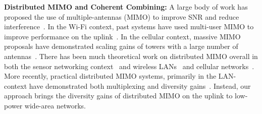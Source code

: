 \noindent \textbf{Distributed MIMO and Coherent Combining: } A large body of work has proposed the use of multiple-antennas (MIMO) to improve SNR and reduce interference~\cite{xie2014scalable, lin2011random, kumar2013bringing}. In the Wi-Fi context, past systems have used multi-user MIMO to improve performance on the uplink~\cite{shen2014rate, tan2009sam, xie2014scalable}. In the cellular context, massive MIMO proposals have demonstrated scaling gains of towers with a large number of antennas~\cite{shepard2012argos, larsson2014massive}. There has been much theoretical work on distributed MIMO overall in both the sensor networking context~\cite{del2007cooperative} and wireless LANs~\cite{dohler2004resource} and cellular networks~\cite{sawahashi2010coordinated}.  More recently, practical distributed MIMO systems, primarily in the LAN-context have demonstrated both multiplexing and diversity gains~\cite{hamed2016real, yenamandra2014vidyut, rahul2012jmb}. Instead, our approach brings the diversity gains of distributed MIMO on the uplink to low-power wide-area networks. 




